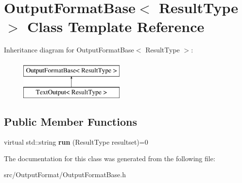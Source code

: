 \hypertarget{class_output_format_base}{\section{Output\-Format\-Base$<$ Result\-Type $>$ Class Template Reference}
\label{class_output_format_base}
}
Inheritance diagram for Output\-Format\-Base$<$ Result\-Type $>$\-:\begin{figure}[H]
\begin{center}
\leavevmode
\includegraphics[height=2.000000cm]{class_output_format_base}
\end{center}
\end{figure}
\subsection*{Public Member Functions}
\begin{DoxyCompactItemize}
\item 
\hypertarget{class_output_format_base_aedb9f11181d66afc7026583fe2b9cec4}{virtual std\-::string {\bfseries run} (Result\-Type resultset)=0}\label{class_output_format_base_aedb9f11181d66afc7026583fe2b9cec4}

\end{DoxyCompactItemize}


The documentation for this class was generated from the following file\-:\begin{DoxyCompactItemize}
\item 
src/\-Output\-Format/Output\-Format\-Base.\-h\end{DoxyCompactItemize}
